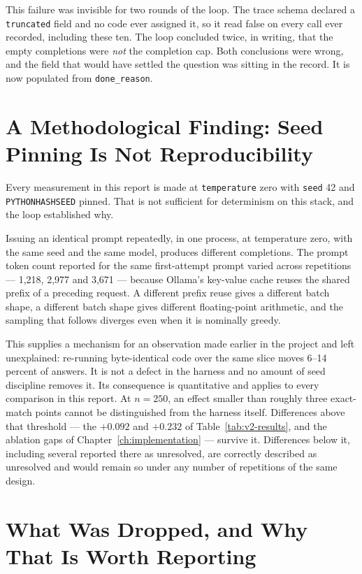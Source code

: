 This failure was invisible for two rounds of the loop. The trace schema declared
a \texttt{truncated} field and no code ever assigned it, so it read false on
every call ever recorded, including these ten. The loop concluded twice, in
writing, that the empty completions were \emph{not} the completion cap. Both
conclusions were wrong, and the field that would have settled the question was
sitting in the record. It is now populated from \texttt{done\_reason}.

\section{A Methodological Finding: Seed Pinning Is Not Reproducibility}
\label{sec:improvement-reproducibility}

Every measurement in this report is made at \texttt{temperature} zero with
\texttt{seed} 42 and \texttt{PYTHONHASHSEED} pinned. That is not sufficient for
determinism on this stack, and the loop established why.

Issuing an identical prompt repeatedly, in one process, at temperature zero,
with the same seed and the same model, produces different completions. The
prompt token count reported for the same first-attempt prompt varied across
repetitions --- 1{,}218, 2{,}977 and 3{,}671 --- because Ollama's key-value
cache reuses the shared prefix of a preceding request. A different prefix reuse
gives a different batch shape, a different batch shape gives different
floating-point arithmetic, and the sampling that follows diverges even when it
is nominally greedy.

This supplies a mechanism for an observation made earlier in the project and
left unexplained: re-running byte-identical code over the same slice moves 6--14
percent of answers. It is not a defect in the harness and no amount of seed
discipline removes it. Its consequence is quantitative and applies to every
comparison in this report. At $n = 250$, an effect smaller than roughly three
exact-match points cannot be distinguished from the harness itself. Differences
above that threshold --- the $+0.092$ and $+0.232$ of
Table~\ref{tab:v2-results}, and the ablation gaps of
Chapter~\ref{ch:implementation} --- survive it. Differences below it, including
several reported there as unresolved, are correctly described as unresolved and
would remain so under any number of repetitions of the same design.

\section{What Was Dropped, and Why That Is Worth Reporting}
\label{sec:improvement-dropped}

